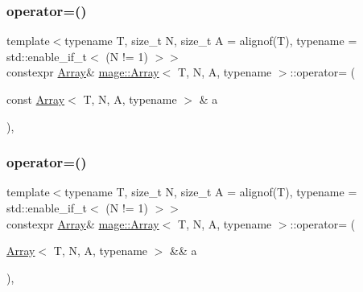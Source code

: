\subsubsection{\texorpdfstring{operator=()}{operator=()}\hspace{0.1cm}{\footnotesize\ttfamily [1/2]}}
{\footnotesize\ttfamily template$<$typename T, size\+\_\+t N, size\+\_\+t A = alignof(\+T), typename  = std\+::enable\+\_\+if\+\_\+t$<$ (\+N != 1) $>$$>$ \\
constexpr \mbox{\hyperlink{structmage_1_1_array}{Array}}\& \mbox{\hyperlink{structmage_1_1_array}{mage\+::\+Array}}$<$ T, N, A, typename $>$\+::operator= (\begin{DoxyParamCaption}\item[{const \mbox{\hyperlink{structmage_1_1_array}{Array}}$<$ T, N, A, typename $>$ \&}]{a }\end{DoxyParamCaption})\hspace{0.3cm}{\ttfamily [default]}, {\ttfamily [noexcept]}}

\mbox{\label{structmage_1_1_array_ae90a7beb10b5edc39331e465af0d1acc}} 
\subsubsection{\texorpdfstring{operator=()}{operator=()}\hspace{0.1cm}{\footnotesize\ttfamily [2/2]}}
{\footnotesize\ttfamily template$<$typename T, size\+\_\+t N, size\+\_\+t A = alignof(\+T), typename  = std\+::enable\+\_\+if\+\_\+t$<$ (\+N != 1) $>$$>$ \\
constexpr \mbox{\hyperlink{structmage_1_1_array}{Array}}\& \mbox{\hyperlink{structmage_1_1_array}{mage\+::\+Array}}$<$ T, N, A, typename $>$\+::operator= (\begin{DoxyParamCaption}\item[{\mbox{\hyperlink{structmage_1_1_array}{Array}}$<$ T, N, A, typename $>$ \&\&}]{a }\end{DoxyParamCaption})\hspace{0.3cm}{\ttfamily [default]}, {\ttfamily [noexcept]}}

